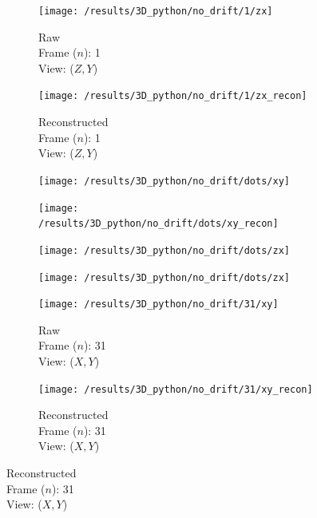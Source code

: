 \begin{figure}
\begin{subfigure}[t]{0.2\linewidth}
    \end{subfigure}\hfill
    \begin{subfigure}[t]{0.2\linewidth}
        \centering
        \texttt{[image: /results/3D\_python/no\_drift/1/zx]}\caption{Raw\\Frame (\(n\)): 1\\View: (\(Z,Y\))}
    \end{subfigure}\hfill
    \begin{subfigure}[t]{0.2\linewidth}
        \centering
        \texttt{[image: /results/3D\_python/no\_drift/1/zx\_recon]}\caption{Reconstructed\\Frame (\(n\)): 1\\View: (\(Z,Y\))}
    \end{subfigure}
    \begin{subfigure}[t]{0.2\linewidth}
        \centering
        \texttt{[image: /results/3D\_python/no\_drift/dots/xy]}%
    \end{subfigure}\hfill
    \begin{subfigure}[t]{0.2\linewidth}
        \centering
        \texttt{[image: /results/3D\_python/no\_drift/dots/xy\_recon]}%
    \end{subfigure}\hfill
    \begin{subfigure}[t]{0.2\linewidth}
        \centering
        \texttt{[image: /results/3D\_python/no\_drift/dots/zx]}%
    \end{subfigure}\hfill
    \begin{subfigure}[t]{0.2\linewidth}
        \centering
        \texttt{[image: /results/3D\_python/no\_drift/dots/zx]}%
    \end{subfigure}
    \begin{subfigure}[t]{0.2\linewidth}
        \centering
        \texttt{[image: /results/3D\_python/no\_drift/31/xy]}\caption{Raw\\Frame (\(n\)): 31\\View: (\(X,Y\))}
    \end{subfigure}\hfill
    \begin{subfigure}[t]{0.2\linewidth}
        \centering
        \texttt{[image: /results/3D\_python/no\_drift/31/xy\_recon]}\caption{Reconstructed\\Frame (\(n\)): 31\\View: (\(X,Y\))}

\end{subfigure}
\end{figure}
